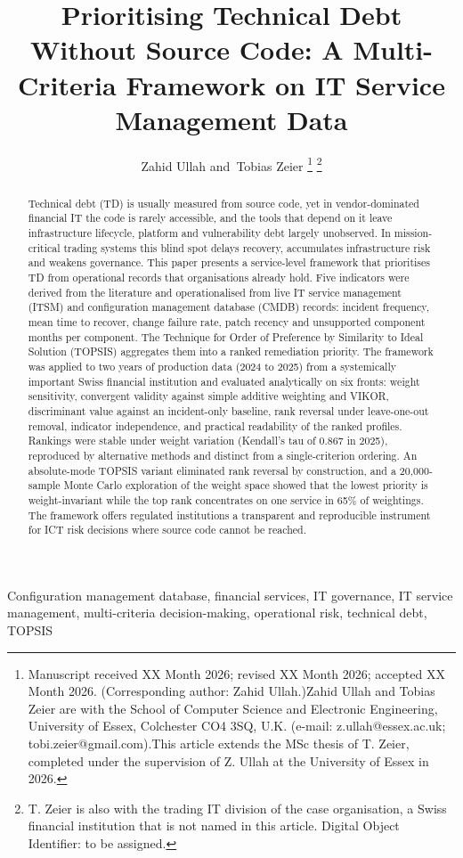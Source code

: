 \documentclass[
  journal,
]{IEEEtran}%
\title{Prioritising Technical Debt Without Source Code: A Multi-Criteria
Framework on IT Service Management Data}
\author{
Zahid Ullah
and~Tobias Zeier%
\thanks{Manuscript received XX Month 2026; revised XX Month 2026;
accepted XX Month 2026. (Corresponding author: Zahid Ullah.)Zahid Ullah
and Tobias Zeier are with the School of Computer Science and Electronic
Engineering, University of Essex, Colchester CO4 3SQ, U.K. (e-mail:
z.ullah@essex.ac.uk; tobi.zeier@gmail.com).This article extends the MSc
thesis of T. Zeier, completed under the supervision of Z. Ullah at the
University of Essex in 2026.}
\thanks{T. Zeier is also with the trading IT division of the case
organisation, a Swiss financial institution that is not named in this
article. Digital Object Identifier: to be assigned.}
}
\begin{document}


\maketitle

\begin{abstract}
Technical debt (TD) is usually measured from source code, yet in
vendor-dominated financial IT the code is rarely accessible, and the
tools that depend on it leave infrastructure lifecycle, platform and
vulnerability debt largely unobserved. In mission-critical trading
systems this blind spot delays recovery, accumulates infrastructure risk
and weakens governance. This paper presents a service-level framework
that prioritises TD from operational records that organisations already
hold. Five indicators were derived from the literature and
operationalised from live IT service management (ITSM) and configuration
management database (CMDB) records: incident frequency, mean time to
recover, change failure rate, patch recency and unsupported component
months per component. The Technique for Order of Preference by
Similarity to Ideal Solution (TOPSIS) aggregates them into a ranked
remediation priority. The framework was applied to two years of
production data (2024 to 2025) from a systemically important Swiss
financial institution and evaluated analytically on six fronts: weight
sensitivity, convergent validity against simple additive weighting and
VIKOR, discriminant value against an incident-only baseline, rank
reversal under leave-one-out removal, indicator independence, and
practical readability of the ranked profiles. Rankings were stable under
weight variation (Kendall's tau of 0.867 in 2025), reproduced by
alternative methods and distinct from a single-criterion ordering. An
absolute-mode TOPSIS variant eliminated rank reversal by construction,
and a 20,000-sample Monte Carlo exploration of the weight space showed
that the lowest priority is weight-invariant while the top rank
concentrates on one service in 65\% of weightings. The framework offers
regulated institutions a transparent and reproducible instrument for ICT
risk decisions where source code cannot be reached.
\end{abstract}
\begin{IEEEkeywords}
Configuration management database, financial services, IT governance, IT
service management, multi-criteria decision-making, operational
risk, technical debt, TOPSIS
\end{IEEEkeywords}
\end{document}
